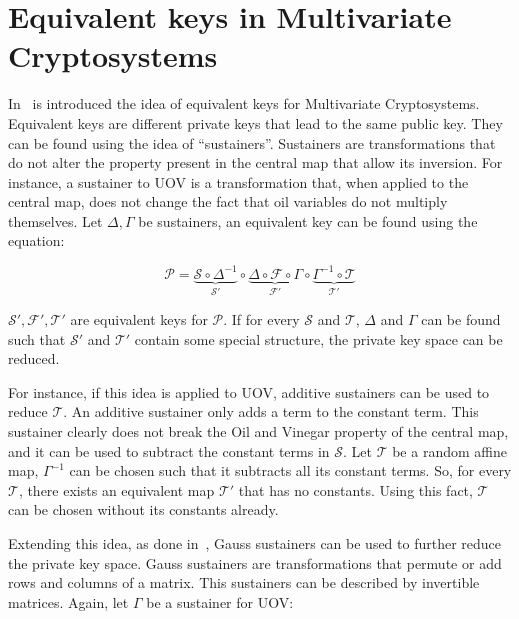 \documentclass{ufsctex/ufsctex}
\begin{document}
\section{Equivalent keys in Multivariate Cryptosystems}
\label{sec:equivalentkeys}

In~\cite{wolf2005equivalent} is introduced the idea of equivalent keys for
Multivariate Cryptosystems. Equivalent keys are different private keys that
lead to the same public key. They can be found using the idea of
``sustainers''. Sustainers are transformations that do not alter the property
present in the central map that allow its inversion. For instance, a sustainer
to UOV is a transformation that, when applied to the central map, does not
change the fact that oil variables do not multiply themselves. Let $\Delta,
\Gamma$ be sustainers, an equivalent key can be found using the equation:

\begin{equation}\label{eq:sustainer}
\mathcal{P} =
\underbrace{\mathcal{S} \circ \Delta^{-1}}_{\mathcal{S'}}
\circ
\underbrace{\Delta \circ \mathcal{F} \circ \Gamma}_{\mathcal{F'}}
\circ
\underbrace{\Gamma^{-1} \circ \mathcal{T}}_{\mathcal{T'}}
\end{equation}

$\mathcal{S'}, \mathcal{F'}, \mathcal{T'}$ are equivalent keys for
$\mathcal{P}$. If for every $\mathcal{S}$ and $\mathcal{T}$, $\Delta$ and
$\Gamma$ can be found such that $\mathcal{S'}$ and $\mathcal{T'}$ contain some
special structure, the private key space can be reduced.

For instance, if this idea is applied to UOV, additive sustainers can be used
to reduce $\mathcal{T}$. An additive sustainer only adds a term to the constant
term. This sustainer clearly does not break the Oil and Vinegar property of the
central map, and it can be used to subtract the constant terms in
$\mathcal{S}$. Let $\mathcal{T}$ be a random affine map, $\Gamma^{-1}$ can be
chosen such that it subtracts all its constant terms. So, for every
$\mathcal{T}$, there exists an equivalent map $\mathcal{T'}$ that has no
constants. Using this fact, $\mathcal{T}$ can be chosen without its constants
already.

Extending this idea, as done in~\cite{wolf2011equivalent}, Gauss sustainers can
be used to further reduce the private key space. Gauss sustainers are
transformations that permute or add rows and columns of a matrix. This
sustainers can be described by invertible matrices. Again, let $\Gamma$ be a
sustainer for UOV:
\end{document}
